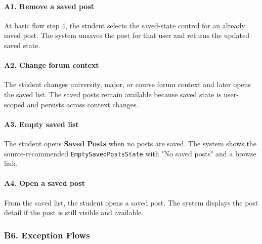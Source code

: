 \documentclass[12pt]{article}
\begin{document}
\hypertarget{sec:a1-remove-a-saved-post}{}
\paragraph*{A1. Remove a saved post}
\par\medskip

At basic flow step 4, the student selects the saved-state control for an already saved post. The system unsaves the post for that user and returns the updated saved state.
\par\medskip

\hypertarget{sec:a2-change-forum-context}{}
\paragraph*{A2. Change forum context}
\par\medskip

The student changes university, major, or course forum context and later opens the saved list. The saved posts remain available because saved state is user-scoped and persists across context changes.
\par\medskip

\hypertarget{sec:a3-empty-saved-list}{}
\paragraph*{A3. Empty saved list}
\par\medskip

The student opens \textbf{Saved Posts} when no posts are saved. The system shows the source-recommended \texttt{EmptySavedPostsState} with "No saved posts" and a browse link.
\par\medskip

\hypertarget{sec:a4-open-a-saved-post}{}
\paragraph*{A4. Open a saved post}
\par\medskip

From the saved list, the student opens a saved post. The system displays the post detail if the post is still visible and available.
\par\medskip

\hypertarget{sec:b6-exception-flows}{}
\subsubsection*{B6. Exception Flows}
\par\medskip
\end{document}
